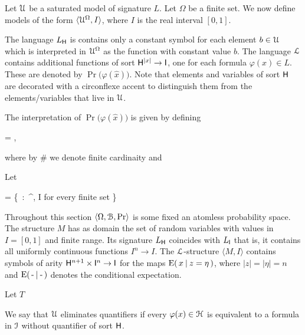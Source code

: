 \documentclass[10pt,oneside]{amsproc}
\begin{document}
Let ${\EuScript U}$ be a saturated model of signature $L$.
Let $\Omega$ be a finite set.
We now define models of the form $\langle{\EuScript U}^\Omega, I\rangle$, where $I$ is the real interval $[0,1]$.

The language $L_{\sf H}$ is contains only a constant symbol for each element $b\in{\EuScript U}$ which is interpreted in ${\EuScript U}^\Omega$ as the function with constant value $b$.
The language ${\EuScript L}$ contains additional functions of sort ${\sf H}^{|x|}\to{\sf I}$, one for each formula $\varphi(x)\in L$.
These are denoted by $\Pr\big(\varphi(\hat x)\big)$. 
Note that elements and variables of sort ${\sf H}$ are decorated with a circonflexe accent to distinguish them from the elements/variables that live in ${\EuScript U}$.

The interpretation of $\Pr\big(\varphi(\hat x)\big)$ is given by defining

{=}
{,}

where by $\#$ we denote finite cardinaity and 



Let 

{=}
{\Big\{\varphi{}\ :\ ^\Omega, I\rangle\models\varphi\textrm{ for every finite set }\Omega\Big\}}



Throughout this section $\langle\Omega,{\EuScript B},\Pr\rangle$ is some fixed an atomless probability space. 
The structure $M$ has as domain the set of random variables with values in $I=[0,1]$ and finite range.
Its signature $L_{\sf H}$ coincides with $L_{\sf I}$ that is, it contains all uniformly continuous functions $I^n\to I$.
The ${\EuScript L}$-structure $\langle M,I\rangle$ contains symbols of arity ${\sf H}^{n+1}\times{\sf I}^n\to{\sf I}$ for the maps  
${\rm E}(\,x\mathbin|z=\eta\,)$, where $|z|=|\eta|=n$ and ${\rm E(\,\mbox-\mathbin|\mbox-\,)}$ denotes the conditional expectation.

Let $T$ 

We say that ${\EuScript U}$ eliminates quantifiers if every $\varphi(x)\in{\EuScript H}$ is equivalent to a formula in ${\EuScript I}$ without quantifier of sort ${\sf H}$.

\begin{proposition}
  
\end{proposition}
\end{document}
